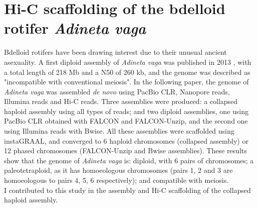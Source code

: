 
\chapter{Hi-C scaffolding of the bdelloid rotifer \textit{Adineta vaga}}

Bdelloid rotifers have been drawing interest due to their unusual ancient asexuality. A first diploid assembly of \textit{Adineta vaga} was published in 2013 \cite{flot2013}, with a total length of 218 Mb and a N50 of 260 kb, and the genome was described as "incompatible with conventional meiosis". In the following paper, the genome of \textit{Adineta vaga} was assembled \textit{de novo} using PacBio CLR, Nanopore reads, Illumina reads and Hi-C reads. Three assemblies were produced: a collapsed haploid assembly using all types of reads; and two diploid assemblies, one using PacBio CLR obtained with FALCON and FALCON-Unzip, and the second one using Illumina reads with Bwise. All these assemblies were scaffolded using instaGRAAL, and converged to 6 haploid chromosomes (collapsed assembly) or 12 phased chromosomes (FALCON-Unzip and Bwise assemblies). These results show that the genome of \textit{Adineta vaga} is: diploid, with 6 pairs of chromosomes; a paleotetraploid, as it has homoeologous chromosomes (pairs 1, 2 and 3 are homoeologous to pairs 4, 5, 6 respectively); and compatible with meiosis. \\
I contributed to this study in the assembly and Hi-C scaffolding of the collapsed haploid assembly. \\

